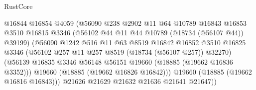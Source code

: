 \begin{lexlean}{RustCore}
\begin{coremodule}
                                        @16844
                                        @16854
                                        @4059
                                        (@56090
                                          @238
                                          @2902
                                          @11
                                          @64
                                          @10789
                                          @16843
                                          @16853
                                          @3510
                                          @16815
                                          @3346
                                          (@56102 @44 @11 @44 @10789 (@18734 (@56107 @44)) @39199)
                                          (@56090
                                            @1242
                                            @516
                                            @11
                                            @63
                                            @8519
                                            @16842
                                            @16852
                                            @3510
                                            @16825
                                            @3346
                                            (@56102
                                              @257
                                              @11
                                              @257
                                              @8519
                                              (@18734 (@56107 @257))
                                              @32270)
                                            (@56139
                                              @16835
                                              @3346
                                              @56148
                                              @56151
                                              @19660
                                              (@18885 (@19662 @16836 @3352)))
                                            @19660
                                            (@18885 (@19662 @16826 @16842)))
                                          @19660
                                          (@18885 (@19662 @16816 @16843)))
                                        @21626
                                        @21629
                                        @21632
                                        @21636
                                        @21641
                                        @21647))

\end{coremodule}
\end{lexlean}
